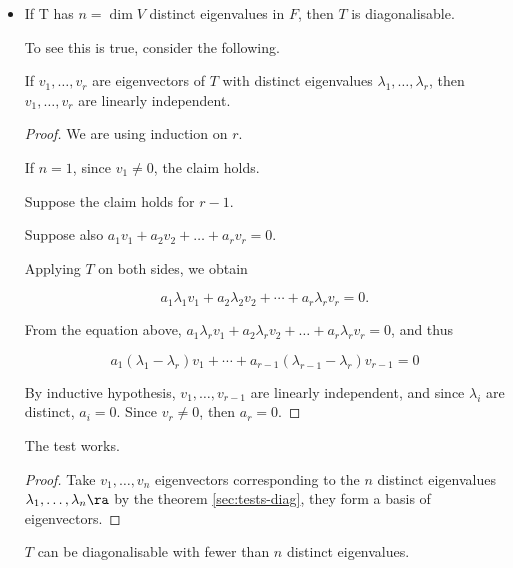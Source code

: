 \documentclass[11pt]{scrartcl}
\begin{document}
\begin{itemize}
\item If T has \(n = \dim V\) distinct eigenvalues in \(F\), then \(T\) is diagonalisable.

  To see this is true, consider the following.
  \begin{theorem}
    \label{sec:tests-diag}
    If \(v_{1}, \dots, v_{r}\) are eigenvectors of \(T\) with distinct
    eigenvalues \(\lambda_{1}, \dots, \lambda_{r}\), then
    \(v_{1}, \dots, v_{r}\) are linearly independent.
  \end{theorem}

  \begin{proof}
    We are using induction on \(r\).

    If \(n=1\), since \(v_{1}\neq 0\), the claim holds.

    Suppose the claim holds for \(r-1\).

    Suppose also \(a_{1}v_{1} + a_{2}v_{2}+\dots+a_{r}v_{r} = 0\).

    Applying \(T\) on both sides, we obtain

    \[a_{1}\lambda_{1}v_{1} + a_{2}\lambda_{2}v_{2} + \cdots + a_{r}\lambda_{r} v_{r} = 0.\]

    From the equation above,
    \(a_{1}\lambda_{r}v_{1} +
    a_{2}\lambda_{r}v_{2}+\dots+a_{r}\lambda_{r}v_{r} = 0\), and thus

    \[
      a_{1}(\lambda_{1} - \lambda_{r})v_{1} + \cdots + a_{r-1}(\lambda_{r-1} - \lambda_{r})v_{r-1} = 0
    \]

    By inductive hypothesis, \(v_{1}, \dots, v_{r-1}\) are linearly
    independent, and since \(\lambda_{i}\) are distinct,
    \(a_{i} = 0\). Since \(v_{r} \neq 0\), then \(a_{r} = 0\).
  \end{proof}

  \begin{corollary}
    The test works.
  \end{corollary}

  \begin{proof}
    Take \(v_{1}, \dots, v_{n}\) eigenvectors corresponding to the
    \(n\) distinct eigenvalues
    \(\lambda_{1}, \dots, \lambda_{n} \ra \) by the theorem
    \ref{sec:tests-diag}, they form a basis of eigenvectors.
  \end{proof}

  \begin{remark}
    \(T\) can be diagonalisable with fewer than \(n\) distinct eigenvalues.
  \end{remark}
  \begin{example}


\end{example}
\end{itemize}
\end{document}
